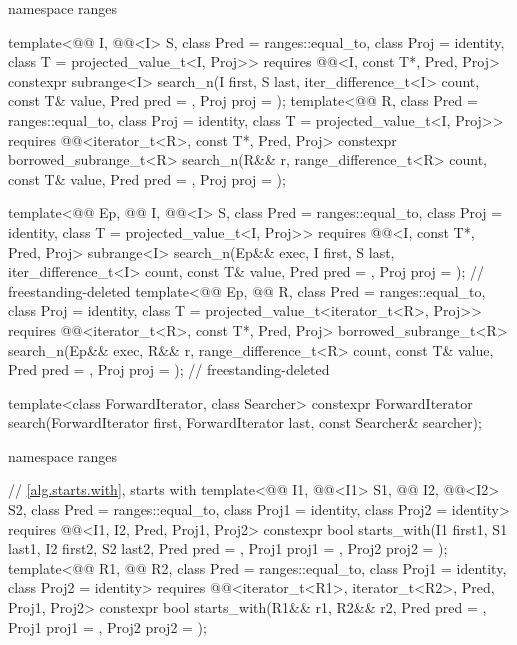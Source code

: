 \begin{codeblock}
{  namespace ranges {
    template<@@ I, @@<I> S,
             class Pred = ranges::equal_to, class Proj = identity,
             class T = projected_value_t<I, Proj>>
      requires @@<I, const T*, Pred, Proj>
      constexpr subrange<I>
        search_n(I first, S last, iter_difference_t<I> count,
                 const T& value, Pred pred = {}, Proj proj = {});
    template<@@ R, class Pred = ranges::equal_to,
             class Proj = identity, class T = projected_value_t<I, Proj>>
      requires @@<iterator_t<R>, const T*, Pred, Proj>
      constexpr borrowed_subrange_t<R>
        search_n(R&& r, range_difference_t<R> count,
                 const T& value, Pred pred = {}, Proj proj = {});

    template<@@ Ep, @@ I, @@<I> S,
             class Pred = ranges::equal_to, class Proj = identity,
             class T = projected_value_t<I, Proj>>
      requires @@<I, const T*, Pred, Proj>
      subrange<I>
        search_n(Ep&& exec, I first, S last, iter_difference_t<I> count,
                 const T& value, Pred pred = {}, Proj proj = {});           // freestanding-deleted
    template<@@ Ep, @@ R, class Pred = ranges::equal_to,
             class Proj = identity, class T = projected_value_t<iterator_t<R>, Proj>>
      requires @@<iterator_t<R>, const T*, Pred, Proj>
      borrowed_subrange_t<R>
        search_n(Ep&& exec, R&& r, range_difference_t<R> count,
                 const T& value, Pred pred = {}, Proj proj = {});           // freestanding-deleted
  }

  template<class ForwardIterator, class Searcher>
    constexpr ForwardIterator
      search(ForwardIterator first, ForwardIterator last, const Searcher& searcher);

  namespace ranges {
    // \ref{alg.starts.with}, starts with
    template<@@ I1, @@<I1> S1, @@ I2, @@<I2> S2,
             class Pred = ranges::equal_to, class Proj1 = identity, class Proj2 = identity>
      requires @@<I1, I2, Pred, Proj1, Proj2>
      constexpr bool starts_with(I1 first1, S1 last1, I2 first2, S2 last2, Pred pred = {},
                                 Proj1 proj1 = {}, Proj2 proj2 = {});
    template<@@ R1, @@ R2, class Pred = ranges::equal_to,
             class Proj1 = identity, class Proj2 = identity>
      requires @@<iterator_t<R1>, iterator_t<R2>, Pred, Proj1, Proj2>
      constexpr bool starts_with(R1&& r1, R2&& r2, Pred pred = {},
                                 Proj1 proj1 = {}, Proj2 proj2 = {});

}}
\end{codeblock}
